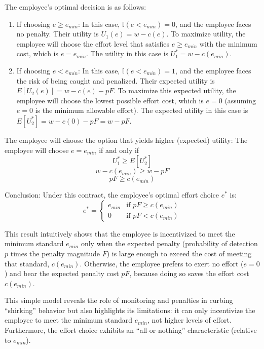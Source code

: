 The employee's optimal decision is as follows:
\begin{enumerate}
    \item {If choosing $e \ge e_{min}$}: In this case, $\mathbb{I}(e < e_{min}) = 0$, and the employee faces no penalty. Their utility is $U_1(e) = w - c(e)$. To maximize utility, the employee will choose the effort level that satisfies $e \ge e_{min}$ with the minimum cost, which is $e = e_{min}$. The utility in this case is $U_1^* = w - c(e_{min})$.

    \item {If choosing $e < e_{min}$}: In this case, $\mathbb{I}(e < e_{min}) = 1$, and the employee faces the risk of being caught and penalized. Their expected utility is $E[U_2(e)] = w - c(e) - pF$. To maximize this expected utility, the employee will choose the lowest possible effort cost, which is $e=0$ (assuming $e=0$ is the minimum allowable effort). The expected utility in this case is $E[U_2^*] = w - c(0) - pF = w - pF$.
\end{enumerate}

The employee will choose the option that yields higher (expected) utility:
The employee will choose $e = e_{min}$ if and only if
\begin{equation}
U_1^* \ge E[U_2^*]
\end{equation}
\begin{equation}
w - c(e_{min}) \ge w - pF
\end{equation}
\begin{equation}
pF \ge c(e_{min})
\end{equation}

{Conclusion}: Under this contract, the employee's optimal effort choice $e^*$ is:
\begin{equation}
e^* = \begin{cases} e_{min} & \text{if } pF \ge c(e_{min}) \\ 0 & \text{if } pF < c(e_{min}) \end{cases}
\end{equation}

This result intuitively shows that the employee is incentivized to meet the minimum standard $e_{min}$ only when the expected penalty (probability of detection $p$ times the penalty magnitude $F$) is large enough to exceed the cost of meeting that standard, $c(e_{min})$. Otherwise, the employee prefers to exert no effort ($e=0$) and bear the expected penalty cost $pF$, because doing so saves the effort cost $c(e_{min})$.

This simple model reveals the role of monitoring and penalties in curbing \enquote{shirking} behavior but also highlights its limitations: it can only incentivize the employee to meet the minimum standard $e_{min}$, not higher levels of effort. Furthermore, the effort choice exhibits an \enquote{all-or-nothing} characteristic (relative to $e_{min}$).


